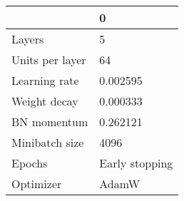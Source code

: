 \begin{tabular}{ll}
\toprule
 & 0 \\
\midrule
Layers & 5 \\
Units per layer & 64 \\
Learning rate & 0.002595 \\
Weight decay & 0.000333 \\
BN momentum & 0.262121 \\
Minibatch size & 4096 \\
Epochs & Early stopping \\
Optimizer & AdamW \\
\bottomrule
\end{tabular}
